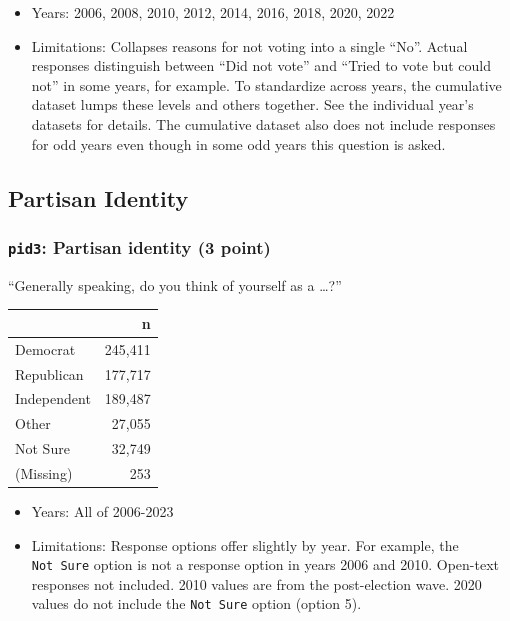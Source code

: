 \documentclass[10pt,article,oneside]{memoir}
\theoremstyle{definition}
\begin{document}
\begin{itemize}
\tightlist
\item
  Years: 2006, 2008, 2010, 2012, 2014, 2016, 2018, 2020, 2022
\item
  Limitations: Collapses reasons for not voting into a single ``No''.
  Actual responses distinguish between ``Did not vote'' and ``Tried to
  vote but could not'' in some years, for example. To standardize across
  years, the cumulative dataset lumps these levels and others together.
  See the individual year's datasets for details. The cumulative dataset
  also does not include responses for odd years even though in some odd
  years this question is asked.
\end{itemize}

\subsection{Partisan Identity}\label{partisan-identity}

\subsubsection{\texorpdfstring{\texttt{pid3}: Partisan identity (3
point)}{pid3: Partisan identity (3 point)}}\label{pid3-partisan-identity-3-point}

``Generally speaking, do you think of yourself as a \ldots?''

\begin{table}[H]
\centering
\begin{tabular}[t]{lr}
\toprule
 & n\\
\midrule
Democrat & 245,411\\
Republican & 177,717\\
Independent & 189,487\\
Other & 27,055\\
Not Sure & 32,749\\
(Missing) & 253\\
\bottomrule
\end{tabular}
\end{table}

\begin{itemize}
\tightlist
\item
  Years: All of 2006-2023
\item
  Limitations: Response options offer slightly by year. For example, the
  \texttt{Not\ Sure} option is not a response option in years 2006 and
  2010. Open-text responses not included. 2010 values are from the
  post-election wave. 2020 values do not include the \texttt{Not\ Sure}
  option (option 5).
\end{itemize}
\end{document}

